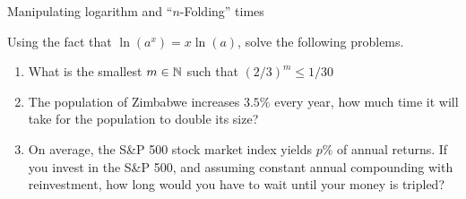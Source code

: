 \documentclass[9pt]{beamer}
\begin{document}




\begin{frame}{Manipulating logarithm and ``$n$-Folding'' times}

    Using the fact that $\ln(a^x) = x\ln(a)$, solve the following problems.
    
    \begin{enumerate}[leftmargin = 0.5cm, label = \arabic*., rightmargin = 0.2cm]

    \item What is the smallest $m\in\mathbb{N}$ such that $(2/3)^m  \leq 1/30$ \\
    
    \item The population of Zimbabwe increases $3.5\%$ every year, how much time it will take for the population to double its size?
    
    \item On average, the S\&P 500 stock market index yields $p\%$ of annual returns. If you invest in the S\&P 500, and assuming constant annual compounding with reinvestment, how long would you have to wait until your money is tripled?

    \end{enumerate}
    
\end{frame}
\end{document}
